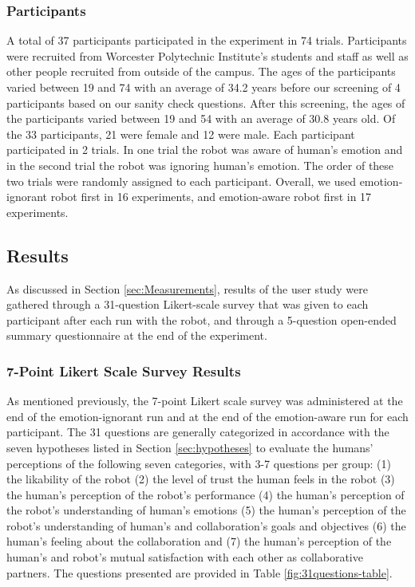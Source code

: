 \documentclass[12pt]{report}
\begin{document}
\subsubsection{Participants}
\label{sec:Participants}
A total of 37 participants participated in the experiment in 74 trials.
Participants were recruited from Worcester Polytechnic Institute's students and
staff as well as other people recruited from outside of the campus. The ages
of the participants varied between 19 and 74 with an average of 34.2 years
before our screening of 4 participants based on our sanity check questions. After
this screening, the ages of the participants varied between 19 and 54 with an
average of 30.8 years old. Of the 33 participants, 21 were female and 12
were male. Each participant participated in 2 trials. In one trial the robot was
aware of human's emotion and in the second trial the robot was ignoring human's
emotion. The order of these two trials were randomly assigned to each
participant. Overall, we used emotion-ignorant robot first in 16 experiments,
and emotion-aware robot first in 17 experiments.

\subsection{Results}

As discussed in Section \ref{sec:Measurements}, results of the user study were
gathered through a 31-question Likert-scale survey that was given to each
participant after each run with the robot, and through a 5-question open-ended
summary questionnaire at the end of the experiment.

\subsubsection{7-Point Likert Scale Survey Results}
As mentioned previously, the 7-point Likert scale survey was administered at
the end of the emotion-ignorant run and at the end of the emotion-aware run for
each participant. The 31 questions are generally categorized in accordance
with the seven hypotheses listed in Section \ref{sec:hypotheses} to evaluate the
humans' perceptions of the following seven categories, with 3-7 questions per
group: (1) the likability of the robot (2) the level of trust the human feels in
the robot (3) the human's perception of the robot's performance (4) the human's
perception of the robot's understanding of human's emotions (5) the human's
perception of the robot's understanding of human's and collaboration's goals and
objectives (6) the human's feeling about the collaboration and (7) the human's
perception of the human's and robot's mutual satisfaction with each other as
collaborative partners. The questions presented are provided in Table
\ref{fig:31questions-table}.
\end{document}
